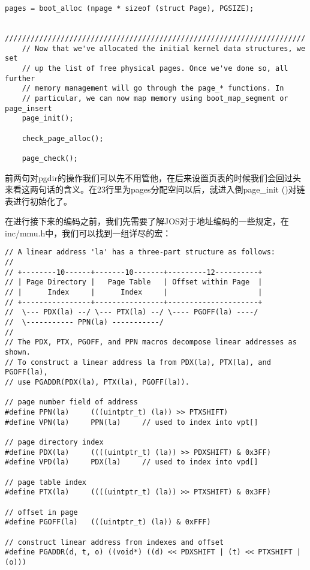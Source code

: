 \documentclass{article}
\newcommand{\funcname}[1]{{\ttfamily \small #1}}
\begin{document}
\begin{CJK*}{UTF8}{gkai}
\begin{lstlisting}[style=ccode, title={\scriptsize \ttfamily \bfseries kern/pmap.c: i386\_vm\_init ()}]
	pages = boot_alloc (npage * sizeof (struct Page), PGSIZE);

	//////////////////////////////////////////////////////////////////////
	// Now that we've allocated the initial kernel data structures, we set
	// up the list of free physical pages. Once we've done so, all further
	// memory management will go through the page_* functions. In
	// particular, we can now map memory using boot_map_segment or page_insert
	page_init();

	check_page_alloc();

	page_check();
\end{lstlisting}

前两句对pgdir的操作我们可以先不用管他，在后来设置页表的时候我们会回过头来看这两句话的含义。在23行里为pages分配空间以后，就进入倒\funcname{page\_init ()}对链表进行初始化了。

在进行接下来的编码之前，我们先需要了解JOS对于地址编码的一些规定，在inc/mmu.h中，我们可以找到一组详尽的宏：

\begin{lstlisting}[style=ccode, firstnumber=16, title={\scriptsize \ttfamily \bfseries inc/mmu.h}]
// A linear address 'la' has a three-part structure as follows:
//
// +--------10------+-------10-------+---------12----------+
// | Page Directory |   Page Table   | Offset within Page  |
// |      Index     |      Index     |                     |
// +----------------+----------------+---------------------+
//  \--- PDX(la) --/ \--- PTX(la) --/ \---- PGOFF(la) ----/
//  \----------- PPN(la) -----------/
//
// The PDX, PTX, PGOFF, and PPN macros decompose linear addresses as shown.
// To construct a linear address la from PDX(la), PTX(la), and PGOFF(la),
// use PGADDR(PDX(la), PTX(la), PGOFF(la)).

// page number field of address
#define PPN(la)		(((uintptr_t) (la)) >> PTXSHIFT)
#define VPN(la)		PPN(la)		// used to index into vpt[]

// page directory index
#define PDX(la)		((((uintptr_t) (la)) >> PDXSHIFT) & 0x3FF)
#define VPD(la)		PDX(la)		// used to index into vpd[]

// page table index
#define PTX(la)		((((uintptr_t) (la)) >> PTXSHIFT) & 0x3FF)

// offset in page
#define PGOFF(la)	(((uintptr_t) (la)) & 0xFFF)

// construct linear address from indexes and offset
#define PGADDR(d, t, o)	((void*) ((d) << PDXSHIFT | (t) << PTXSHIFT | (o)))
\end{lstlisting}



\end{CJK*}
\end{document}
